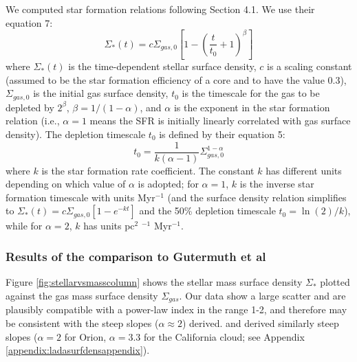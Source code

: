 \documentclass[twocolumn]{aastex61}
\begin{document}
We computed star formation relations following \citet{Gutermuth2011a} Section 4.1.
We use their equation 7:
\begin{equation}
    \label{eqn:stellarsurfdens}
    \Sigma_*(t) = c \Sigma_{gas,0} \left[1-\left(\frac{t}{t_0}+1\right)^\beta\right]
\end{equation}
where $\Sigma_*(t)$ is the time-dependent stellar surface density, $c$ is a
scaling constant (assumed to be the star formation efficiency of a core and
to have the value 0.3), $\Sigma_{gas,0}$ is the initial gas surface density,  $t_0$
is the timescale for the gas to be depleted by $2^{\beta}$, $\beta =
1/(1-\alpha)$, and $\alpha$ is
the exponent in the star formation relation (i.e., $\alpha=1$ means the SFR is
initially linearly correlated with gas surface density).
The depletion timescale $t_0$ is defined by their equation 5:
\begin{equation}
    t_0 = \frac{1}{k(\alpha-1)} \Sigma_{gas,0}^{1-\alpha}
\end{equation}
where $k$ is the star formation rate coefficient.  The constant $k$ has
different units depending on which value of $\alpha$ is adopted; for
$\alpha=1$, $k$ is the inverse star formation timescale with units Myr$^{-1}$
(and the surface density relation simplifies to $\Sigma_*(t) = c
\Sigma_{gas,0}[1-e^{-kt}]$ and the 50\% depletion timescale $t_0=\ln(2)/k$),
while for $\alpha=2$, $k$ has units pc$^{2}$ \msun$^{-1}$ Myr$^{-1}$.



\subsubsection{Results of the comparison to Gutermuth et al}
\label{sec:gutermuthcomparison}



Figure \ref{fig:stellarvsmasscolumn} shows the stellar mass surface density
$\Sigma_*$ plotted against the gas mass surface density $\Sigma_{gas}$.
Our data show a large scatter and are plausibly compatible with a
power-law index in the range 1-2, and therefore may be consistent with the
steep slopes ($\alpha\approx2$) \citet{Gutermuth2011a} derived.
\citet{Lada2017a} and \citet{Lombardi2014a} derived similarly steep
slopes ($\alpha=2$ for Orion, $\alpha=3.3$ for the California cloud;
see Appendix \ref{appendix:ladasurfdensappendix}).
\end{document}
